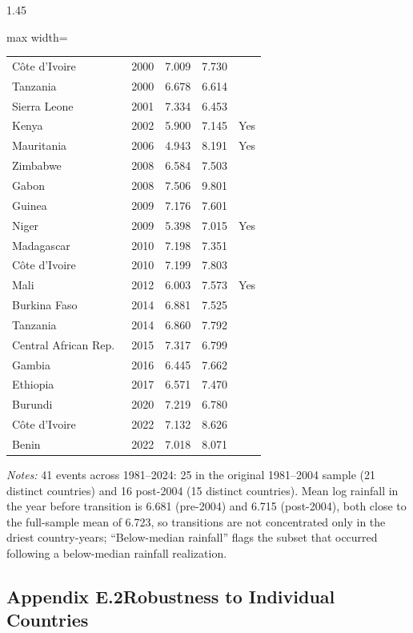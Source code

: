 \documentclass[12pt]{article}
\begin{document}
\begin{bibunit}[jpe]
\begin{spacing}{1.45}
\begin{table}[H]
\begin{adjustbox}{max width=\textwidth}
\begin{threeparttable}
\begin{tabular}{llccc}
C\^ote d'Ivoire & 2000 & 7.009 & 7.730 & \\
Tanzania & 2000 & 6.678 & 6.614 & \\
Sierra Leone & 2001 & 7.334 & 6.453 & \\
Kenya & 2002 & 5.900 & 7.145 & Yes \\
Mauritania & 2006 & 4.943 & 8.191 & Yes \\
Zimbabwe & 2008 & 6.584 & 7.503 & \\
Gabon & 2008 & 7.506 & 9.801 & \\
Guinea & 2009 & 7.176 & 7.601 & \\
Niger & 2009 & 5.398 & 7.015 & Yes \\
Madagascar & 2010 & 7.198 & 7.351 & \\
C\^ote d'Ivoire & 2010 & 7.199 & 7.803 & \\
Mali & 2012 & 6.003 & 7.573 & Yes \\
Burkina Faso & 2014 & 6.881 & 7.525 & \\
Tanzania & 2014 & 6.860 & 7.792 & \\
Central African Rep.\ & 2015 & 7.317 & 6.799 & \\
Gambia & 2016 & 6.445 & 7.662 & \\
Ethiopia & 2017 & 6.571 & 7.470 & \\
Burundi & 2020 & 7.219 & 6.780 & \\
C\^ote d'Ivoire & 2022 & 7.132 & 8.626 & \\
Benin & 2022 & 7.018 & 8.071 & \\
\bottomrule
\end{tabular}
\begin{tablenotes}[flushleft]
\footnotesize
\item \textit{Notes:} 41 events across 1981--2024: 25 in the original 1981--2004 sample (21 distinct countries) and 16 post-2004 (15 distinct countries). Mean log rainfall in the year before transition is 6.681 (pre-2004) and 6.715 (post-2004), both close to the full-sample mean of 6.723, so transitions are not concentrated only in the driest country-years; ``Below-median rainfall'' flags the subset that occurred following a below-median rainfall realization.
\end{tablenotes}
\end{threeparttable}
\end{adjustbox}
\end{table}

\subsection*{Appendix E.2\quad Robustness to Individual Countries}


\end{spacing}
\end{bibunit}
\end{document}

